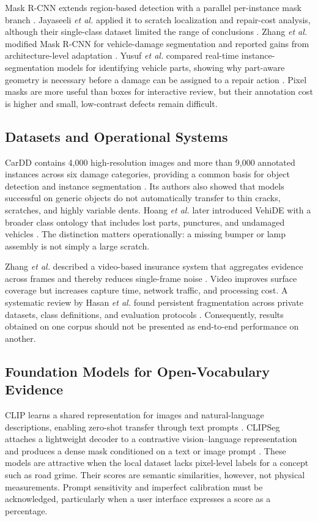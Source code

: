 \documentclass[conference]{IEEEtran}
\begin{document}
Mask R-CNN extends region-based detection with a parallel per-instance mask branch \cite{he2017mask}. Jayaseeli \emph{et al.} applied it to scratch localization and repair-cost analysis, although their single-class dataset limited the range of conclusions \cite{jayaseeli2021}. Zhang \emph{et al.} modified Mask R-CNN for vehicle-damage segmentation and reported gains from architecture-level adaptation \cite{zhang2020access}. Yusuf \emph{et al.} compared real-time instance-segmentation models for identifying vehicle parts, showing why part-aware geometry is necessary before a damage can be assigned to a repair action \cite{yusuf2023}. Pixel masks are more useful than boxes for interactive review, but their annotation cost is higher and small, low-contrast defects remain difficult.

\subsection{Datasets and Operational Systems}

CarDD contains 4,000 high-resolution images and more than 9,000 annotated instances across six damage categories, providing a common basis for object detection and instance segmentation \cite{wang2023cardd}. Its authors also showed that models successful on generic objects do not automatically transfer to thin cracks, scratches, and highly variable dents. Hoang \emph{et al.} later introduced VehiDE with a broader class ontology that includes lost parts, punctures, and undamaged vehicles \cite{hoang2025}. The distinction matters operationally: a missing bumper or lamp assembly is not simply a large scratch.

Zhang \emph{et al.} described a video-based insurance system that aggregates evidence across frames and thereby reduces single-frame noise \cite{zhang2020aaai}. Video improves surface coverage but increases capture time, network traffic, and processing cost. A systematic review by Hasan \emph{et al.} found persistent fragmentation across private datasets, class definitions, and evaluation protocols \cite{hasan2025}. Consequently, results obtained on one corpus should not be presented as end-to-end performance on another.

\subsection{Foundation Models for Open-Vocabulary Evidence}

CLIP learns a shared representation for images and natural-language descriptions, enabling zero-shot transfer through text prompts \cite{radford2021}. CLIPSeg attaches a lightweight decoder to a contrastive vision--language representation and produces a dense mask conditioned on a text or image prompt \cite{luddecke2022}. These models are attractive when the local dataset lacks pixel-level labels for a concept such as road grime. Their scores are semantic similarities, however, not physical measurements. Prompt sensitivity and imperfect calibration must be acknowledged, particularly when a user interface expresses a score as a percentage.
\end{document}
